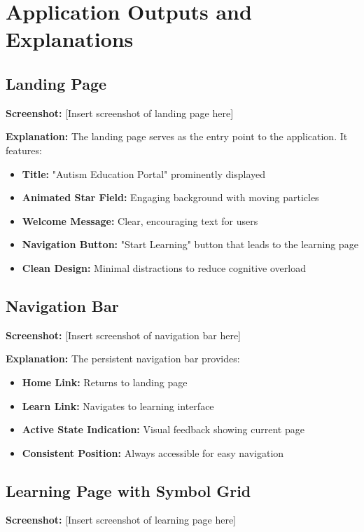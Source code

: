 \documentclass[12pt,a4paper]{article}
\begin{document}
\newpage
\section{Application Outputs and Explanations}

\subsection{Landing Page}
\textbf{Screenshot:} [Insert screenshot of landing page here]

\textbf{Explanation:} 
The landing page serves as the entry point to the application. It features:
\begin{itemize}
    \item \textbf{Title:} "Autism Education Portal" prominently displayed
    \item \textbf{Animated Star Field:} Engaging background with moving particles
    \item \textbf{Welcome Message:} Clear, encouraging text for users
    \item \textbf{Navigation Button:} "Start Learning" button that leads to the learning page
    \item \textbf{Clean Design:} Minimal distractions to reduce cognitive overload
\end{itemize}

\subsection{Navigation Bar}
\textbf{Screenshot:} [Insert screenshot of navigation bar here]

\textbf{Explanation:}
The persistent navigation bar provides:
\begin{itemize}
    \item \textbf{Home Link:} Returns to landing page
    \item \textbf{Learn Link:} Navigates to learning interface
    \item \textbf{Active State Indication:} Visual feedback showing current page
    \item \textbf{Consistent Position:} Always accessible for easy navigation
\end{itemize}

\subsection{Learning Page with Symbol Grid}
\textbf{Screenshot:} [Insert screenshot of learning page here]
\end{document}
